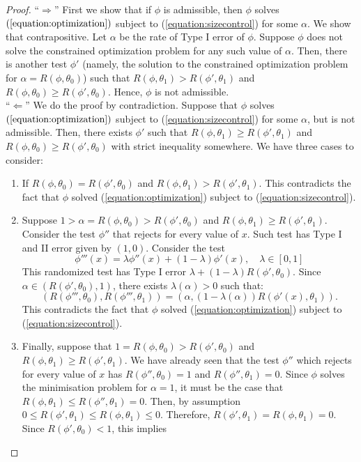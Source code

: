 \documentclass[11pt]{article} %
\begin{document}
\begin{proof}
\noindent ``$\Rightarrow$'' First we show that if $\phi$ is admissible, then $\phi$ solves $(\ref{equation:optimization})$ subject to  (\ref{equation:sizecontrol}) for some $\alpha$. We show that contrapositive. Let $\alpha$ be the rate of Type I error of $\phi$. Suppose $\phi$ does not solve the constrained optimization problem for any such value of $\alpha$. Then, there is another test $\phi'$ (namely, the solution to the constrained optimization problem for $\alpha = R(\phi,\theta_0)$) such that  $R(\phi,\theta_1) > R(\phi',\theta_1) $ and $R(\phi,\theta_0) \geq R(\phi',\theta_0)$. Hence, $\phi$ is not admissible. \\

\noindent ``$\Leftarrow$'' We do the proof by contradiction. Suppose that $\phi$ solves $(\ref{equation:optimization})$ subject to  (\ref{equation:sizecontrol}) for some $\alpha$, but is not admissible. Then, there exists $\phi'$ such that $R(\phi,\theta_1) \geq R(\phi',\theta_1) $ and $R(\phi,\theta_0) \geq R(\phi',\theta_0)$ with strict inequality somewhere. We have three cases to consider: 
\begin{enumerate}
\item If $R(\phi,\theta_0)=R(\phi', \theta_0)$ and $R(\phi,\theta_1) > R(\phi',\theta_1)$. This contradicts the fact that $\phi$ solved (\ref{equation:optimization}) subject to  (\ref{equation:sizecontrol}).\\

\item Suppose $1>\alpha=R(\phi,\theta_0) > R(\phi', \theta_0)$ and $R(\phi,\theta_1) \geq R(\phi',\theta_1)$. Consider the test $\phi''$ that rejects for every value of $x$. Such test has Type I and II error given by $(1,0)$. Consider the test 
$$\phi'''(x)= \lambda \phi''(x) + (1-\lambda) \phi'(x), \quad \lambda \in [0,1] $$
\noindent This randomized test has Type I error $\lambda + (1-\lambda)R(\phi', \theta_0)$. Since $\alpha \in (R(\phi',\theta_0),1)$, there exists $\lambda(\alpha)>0$ such that:
$$(R(\phi''',\theta_0), R(\phi''',\theta_1))= (\alpha, (1-\lambda(\alpha))R(\phi'(x),\theta_1)).$$
\noindent This contradicts the fact that $\phi$ solved (\ref{equation:optimization}) subject to  (\ref{equation:sizecontrol}).

\item Finally, suppose that $1=R(\phi,\theta_0)>R(\phi',\theta_0)$ and $R(\phi,\theta_1) \geq R(\phi',\theta_1)$. We have already seen that the test
$\phi''$ which rejects for every value of $x$ has $R(\phi'',\theta_0)=1$ and $R(\phi'',\theta_1)=0$. Since $\phi$ solves the minimisation problem for $\alpha=1$, it must be the case that $R(\phi,\theta_1) \leq R(\phi'',\theta_1) = 0$. Then, by assumption $0 \leq R(\phi',\theta_1) \leq R(\phi,\theta_1) \leq 0$. Therefore, $R(\phi',\theta_1) = R(\phi,\theta_1) = 0$. Since $R(\phi',\theta_0)<1$, this implies


\end{enumerate}
\end{proof}
\end{document}
